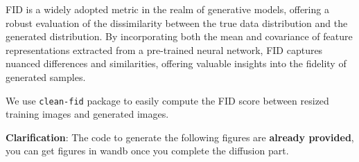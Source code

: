 \documentclass[11pt,addpoints,answers]{exam}
\begin{document}
\begin{questions}
    FID is a widely adopted metric in the realm of generative models, offering a robust evaluation of the dissimilarity between the true data distribution and the generated distribution. By incorporating both the mean and covariance of feature representations extracted from a pre-trained neural network, FID captures nuanced differences and similarities, offering valuable insights into the fidelity of generated samples.
    
    We use \lstinline{clean-fid} package to easily compute the FID score between
    resized training images and generated images.
    
\clearpage
{}

\textbf{Clarification}: The code to generate the following figures are \textbf{already provided}, you can get figures in wandb once you complete the diffusion part.

\end{questions}
\end{document}
